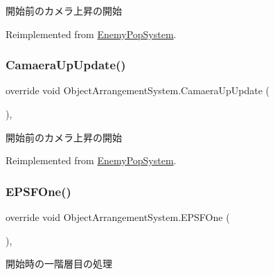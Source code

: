 開始前のカメラ上昇の開始 



Reimplemented from \hyperlink{class_enemy_pop_system_a0dff3d5cf8729600043c1875be746eed}{Enemy\+Pop\+System}.

\mbox{\label{class_object_arrangement_system_a7fba170e4af44f3ea4083edebe7e74fc}} 
\subsubsection{\texorpdfstring{Camaera\+Up\+Update()}{CamaeraUpUpdate()}}
{\footnotesize\ttfamily override void Object\+Arrangement\+System.\+Camaera\+Up\+Update (\begin{DoxyParamCaption}{ }\end{DoxyParamCaption})\hspace{0.3cm}{\ttfamily [inline]}, {\ttfamily [virtual]}}



開始前のカメラ上昇の開始 



Reimplemented from \hyperlink{class_enemy_pop_system_af242685f6dfd6d73c04ad284c7ae714c}{Enemy\+Pop\+System}.

\mbox{\label{class_object_arrangement_system_ade64515d0fbc603769836f567070264c}} 
\subsubsection{\texorpdfstring{E\+P\+S\+F\+One()}{EPSFOne()}}
{\footnotesize\ttfamily override void Object\+Arrangement\+System.\+E\+P\+S\+F\+One (\begin{DoxyParamCaption}{ }\end{DoxyParamCaption})\hspace{0.3cm}{\ttfamily [inline]}, {\ttfamily [virtual]}}



開始時の一階層目の処理 



